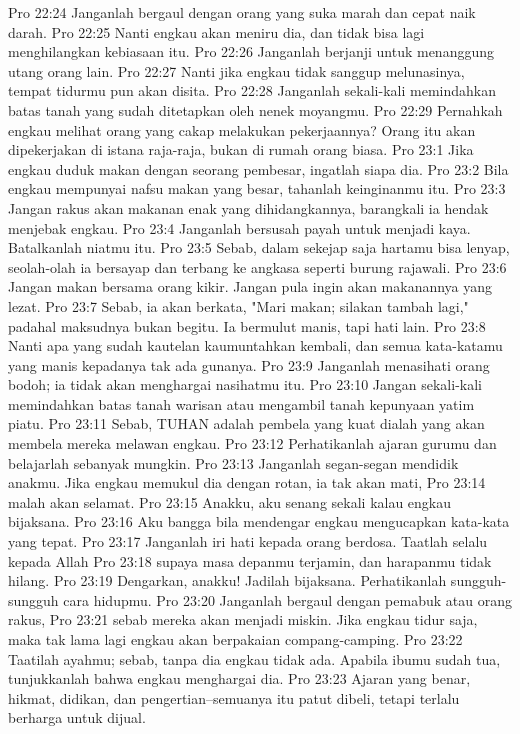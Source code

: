 Pro 22:24  Janganlah bergaul dengan orang yang suka marah dan cepat naik darah.
Pro 22:25  Nanti engkau akan meniru dia, dan tidak bisa lagi menghilangkan kebiasaan itu.
Pro 22:26  Janganlah berjanji untuk menanggung utang orang lain.
Pro 22:27  Nanti jika engkau tidak sanggup melunasinya, tempat tidurmu pun akan disita.
Pro 22:28  Janganlah sekali-kali memindahkan batas tanah yang sudah ditetapkan oleh nenek moyangmu.
Pro 22:29  Pernahkah engkau melihat orang yang cakap melakukan pekerjaannya? Orang itu akan dipekerjakan di istana raja-raja, bukan di rumah orang biasa.
Pro 23:1  Jika engkau duduk makan dengan seorang pembesar, ingatlah siapa dia.
Pro 23:2  Bila engkau mempunyai nafsu makan yang besar, tahanlah keinginanmu itu.
Pro 23:3  Jangan rakus akan makanan enak yang dihidangkannya, barangkali ia hendak menjebak engkau.
Pro 23:4  Janganlah bersusah payah untuk menjadi kaya. Batalkanlah niatmu itu.
Pro 23:5  Sebab, dalam sekejap saja hartamu bisa lenyap, seolah-olah ia bersayap dan terbang ke angkasa seperti burung rajawali.
Pro 23:6  Jangan makan bersama orang kikir. Jangan pula ingin akan makanannya yang lezat.
Pro 23:7  Sebab, ia akan berkata, "Mari makan; silakan tambah lagi," padahal maksudnya bukan begitu. Ia bermulut manis, tapi hati lain.
Pro 23:8  Nanti apa yang sudah kautelan kaumuntahkan kembali, dan semua kata-katamu yang manis kepadanya tak ada gunanya.
Pro 23:9  Janganlah menasihati orang bodoh; ia tidak akan menghargai nasihatmu itu.
Pro 23:10  Jangan sekali-kali memindahkan batas tanah warisan atau mengambil tanah kepunyaan yatim piatu.
Pro 23:11  Sebab, TUHAN adalah pembela yang kuat dialah yang akan membela mereka melawan engkau.
Pro 23:12  Perhatikanlah ajaran gurumu dan belajarlah sebanyak mungkin.
Pro 23:13  Janganlah segan-segan mendidik anakmu. Jika engkau memukul dia dengan rotan, ia tak akan mati,
Pro 23:14  malah akan selamat.
Pro 23:15  Anakku, aku senang sekali kalau engkau bijaksana.
Pro 23:16  Aku bangga bila mendengar engkau mengucapkan kata-kata yang tepat.
Pro 23:17  Janganlah iri hati kepada orang berdosa. Taatlah selalu kepada Allah
Pro 23:18  supaya masa depanmu terjamin, dan harapanmu tidak hilang.
Pro 23:19  Dengarkan, anakku! Jadilah bijaksana. Perhatikanlah sungguh-sungguh cara hidupmu.
Pro 23:20  Janganlah bergaul dengan pemabuk atau orang rakus,
Pro 23:21  sebab mereka akan menjadi miskin. Jika engkau tidur saja, maka tak lama lagi engkau akan berpakaian compang-camping.
Pro 23:22  Taatilah ayahmu; sebab, tanpa dia engkau tidak ada. Apabila ibumu sudah tua, tunjukkanlah bahwa engkau menghargai dia.
Pro 23:23  Ajaran yang benar, hikmat, didikan, dan pengertian--semuanya itu patut dibeli, tetapi terlalu berharga untuk dijual.
